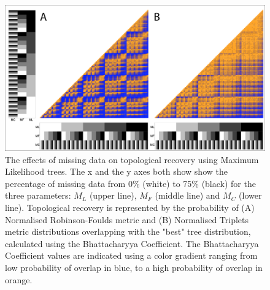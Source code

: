 \documentclass[12pt,letterpaper]{article}
\begin{document}
\begin{figure} 
\centering
    \includegraphics[width=1\textwidth]{SupplementaryFigures/PairwiseComp-ML-RF+Tr-colour.png} %
    \caption{The effects of missing data on topological recovery using Maximum Likelihood trees. The x and the y axes both show show the percentage of missing data from 0\% (white) to 75\% (black) for the three parameters: $M_{L}$ (upper line), $M_{F}$ (middle line) and $M_{C}$ (lower line). Topological recovery is represented by the probability of (A) Normalised Robinson-Foulds metric and (B) Normalised Triplets metric distributions overlapping with the "best" tree distribution, calculated using the Bhattacharyya Coefficient. The Bhattacharyya Coefficient values are indicated using a color gradient ranging from low probability of overlap in blue, to a high probability of overlap in orange.}
\label{Fig_Supp_paircomp_ML}
\end{figure} 
\end{document}
